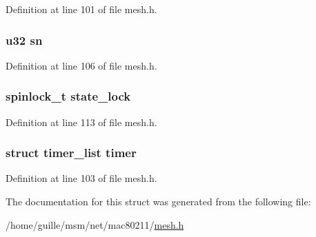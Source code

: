 Definition at line 101 of file mesh.\-h.

\hypertarget{structmesh__path_a3a5989b8e6d4286ac3822b65bbc1cf16}{
\subsubsection[{sn}]{\setlength{\rightskip}{0pt plus 5cm}u32 sn}}\label{structmesh__path_a3a5989b8e6d4286ac3822b65bbc1cf16}


Definition at line 106 of file mesh.\-h.

\hypertarget{structmesh__path_a906a637c5d4df9d7a2a5a407cc01b8ac}{
\subsubsection[{state\-\_\-lock}]{\setlength{\rightskip}{0pt plus 5cm}spinlock\-\_\-t state\-\_\-lock}}\label{structmesh__path_a906a637c5d4df9d7a2a5a407cc01b8ac}


Definition at line 113 of file mesh.\-h.

\hypertarget{structmesh__path_ae8aedee6c0bd2f7edbb10f18d574f107}{
\subsubsection[{timer}]{\setlength{\rightskip}{0pt plus 5cm}struct timer\-\_\-list timer}}\label{structmesh__path_ae8aedee6c0bd2f7edbb10f18d574f107}


Definition at line 103 of file mesh.\-h.



The documentation for this struct was generated from the following file\-:\begin{DoxyCompactItemize}
\item 
/home/guille/msm/net/mac80211/\hyperlink{mesh_8h}{mesh.\-h}\end{DoxyCompactItemize}
